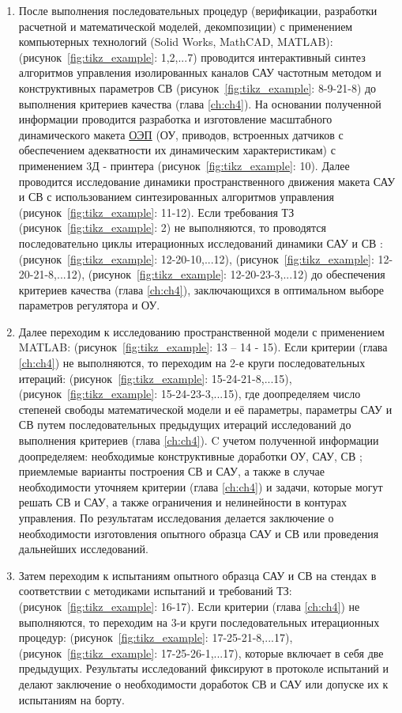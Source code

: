 \begin{enumerate}
	\item После выполнения последовательных процедур (верификации, разработки расчетной и математической моделей, декомпозиции) с применением компьютерных технологий (Solid Works, MathCAD, MATLAB): (рисунок~\ref{fig:tikz_example}: 1,2,...7) проводится интерактивный синтез алгоритмов управления изолированных каналов САУ частотным методом \cite[]{Bessekerski20} и конструктивных параметров СВ (рисунок~\ref{fig:tikz_example}: 8-9-21-8) до выполнения критериев качества (глава \ref{ch:ch4}). На основании полученной информации проводится разработка и изготовление масштабного динамического макета \hyperref[acroEOS]{ОЭП} (ОУ, приводов, встроенных датчиков с обеспечением адекватности их динамическим характеристикам) с применением 3Д - принтера (рисунок~\ref{fig:tikz_example}: 10). Далее проводится исследование динамики пространственного движения макета САУ и СВ с использованием синтезированных алгоритмов управления (рисунок~\ref{fig:tikz_example}: 11-12). Если требования ТЗ (рисунок~\ref{fig:tikz_example}: 2) не выполняются, то проводятся последовательно циклы итерационных исследований динамики САУ и СВ : (рисунок~\ref{fig:tikz_example}: 12-20-10,...12), (рисунок~\ref{fig:tikz_example}: 12-20-21-8,...12), (рисунок~\ref{fig:tikz_example}: 12-20-23-3,...12) до обеспечения критериев качества (глава \ref{ch:ch4}), заключающихся в оптимальном выборе параметров регулятора и ОУ.
	\item Далее переходим к исследованию пространственной модели с применением MATLAB: 
	(рисунок~\ref{fig:tikz_example}: 13 – 14 - 15). Если критерии (глава \ref{ch:ch4}) не выполняются, то переходим на 2-е круги последовательных итераций: (рисунок~\ref{fig:tikz_example}: 15-24-21-8,...15), (рисунок~\ref{fig:tikz_example}: 15-24-23-3,...15), где доопределяем число степеней свободы математической модели и её параметры, параметры САУ и СВ путем последовательных предыдущих итераций исследований до выполнения критериев (глава \ref{ch:ch4}). C учетом полученной информации доопределяем: необходимые конструктивные доработки  ОУ, САУ, СВ ; приемлемые варианты построения СВ и САУ, а также в случае необходимости уточняем критерии (глава \ref{ch:ch4}) и задачи, которые могут решать СВ и САУ, а также ограничения и нелинейности в контурах управления. По результатам исследования делается заключение о необходимости изготовления опытного образца САУ и СВ или проведения дальнейших исследований.
	
	\item Затем переходим к испытаниям опытного образца САУ и СВ на стендах в соответствии с методиками испытаний и требований ТЗ: (рисунок~\ref{fig:tikz_example}: 16-17). Если критерии (глава \ref{ch:ch4}) не выполняются, то переходим  на 
	3-и круги последовательных итерационных процедур: (рисунок~\ref{fig:tikz_example}: 17-25-21-8,...17), (рисунок~\ref{fig:tikz_example}: 17-25-26-1,...17), которые включает в себя две предыдущих. Результаты исследований фиксируют в протоколе испытаний и делают заключение о необходимости доработок СВ и САУ или допуске их к испытаниям на борту. 
	

\end{enumerate}

